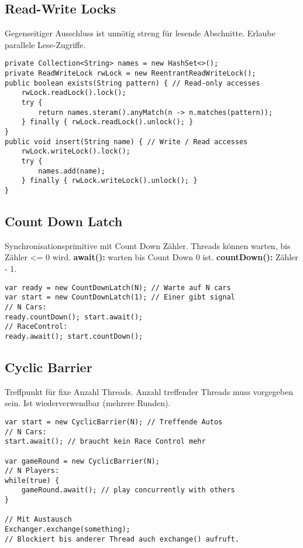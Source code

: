 \subsection{Read-Write Locks}
Gegenseitiger Ausschluss ist unnötig streng für lesende Abschnitte.
Erlaube parallele Lese-Zugriffe.

\begin{lstlisting}
private Collection<String> names = new HashSet<>();
private ReadWriteLock rwLock = new ReentrantReadWriteLock();
public boolean exists(String pattern) { // Read-only accesses
    rwLock.readLock().lock();
    try {
        return names.steram().anyMatch(n -> n.matches(pattern));
    } finally { rwLock.readLock().unlock(); }
}
public void insert(String name) { // Write / Read accesses
    rwLock.writeLock().lock();
    try {
        names.add(name);
    } finally { rwLock.writeLock().unlock(); }
}
\end{lstlisting}

\subsection{Count Down Latch}
Synchronisationsprimitive mit Count Down Zähler.
Threads können warten, bis Zähler <= 0 wird.
\textbf{await():} warten bis Count Down 0 ist.
\textbf{countDown():} Zähler - 1.

\begin{lstlisting}
var ready = new CountDownLatch(N); // Warte auf N cars
var start = new CountDownLatch(1); // Einer gibt signal
// N Cars:
ready.countDown(); start.await();
// RaceControl:
ready.await(); start.countDown();
\end{lstlisting}

\subsection{Cyclic Barrier}
Treffpunkt für fixe Anzahl Threads. Anzahl treffender Threads muss vorgegeben sein.
Ist wiederverwendbar (mehrere Runden).

\begin{lstlisting}
var start = new CyclicBarrier(N); // Treffende Autos
// N Cars:
start.await(); // braucht kein Race Control mehr

var gameRound = new CyclicBarrier(N);
// N Players:
while(true) {
    gameRound.await(); // play concurrently with others
}

// Mit Austausch
Exchanger.exchange(something);
// Blockiert bis anderer Thread auch exchange() aufruft.
\end{lstlisting}